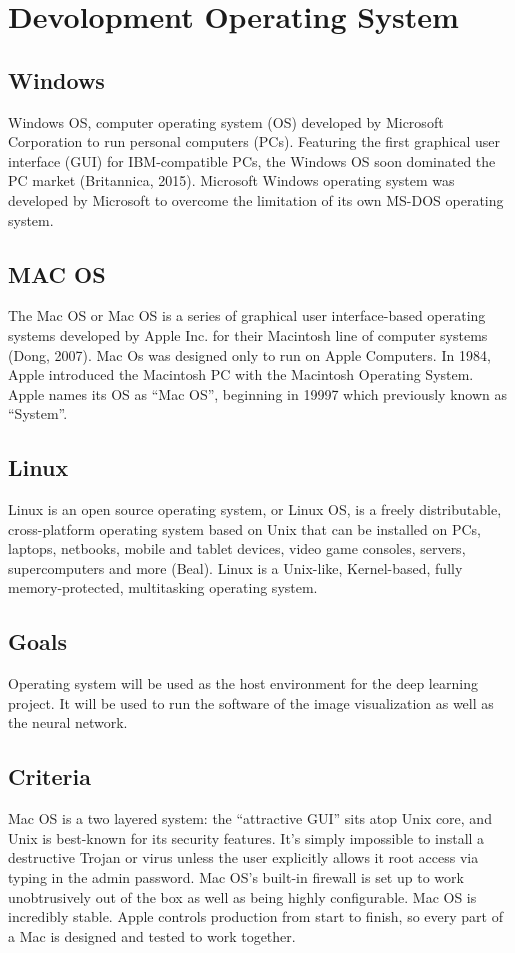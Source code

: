 \documentclass{scrreprt}
\begin{document}
\section{Devolopment Operating System}

\subsection{Windows}
Windows OS, computer operating system (OS) developed by Microsoft Corporation to run personal
computers (PCs). Featuring the first graphical user interface (GUI) for IBM-compatible PCs, the Windows
OS soon dominated the PC market (Britannica, 2015). Microsoft Windows operating system was
developed by Microsoft to overcome the limitation of its own MS-DOS operating system.

\subsection{MAC OS}
The Mac OS or Mac OS is a series of graphical user interface-based operating systems developed by
Apple Inc. for their Macintosh line of computer systems (Dong, 2007). Mac Os was designed only to run
on Apple Computers. In 1984, Apple introduced the Macintosh PC with the Macintosh Operating
System. Apple names its OS as “Mac OS”, beginning in 19997 which previously known as “System”.

\subsection{Linux}
Linux is an open source operating system, or Linux OS, is a freely distributable, cross-platform operating
system based on Unix that can be installed on PCs, laptops, netbooks, mobile and tablet devices, video
game consoles, servers, supercomputers and more (Beal). Linux is a Unix-like, Kernel-based, fully
memory-protected, multitasking operating system.

\subsection{Goals}
Operating system will be used as the host environment for the deep learning project.
It will be used to run the software of the image visualization as well as the neural network.

\subsection{Criteria}
Mac OS is a two layered system: the “attractive GUI” sits atop Unix core, and Unix is best-known for its
security features. It’s simply impossible to install a destructive Trojan or virus unless the user explicitly
allows it root access via typing in the admin password. Mac OS’s built-in firewall is set up to work
unobtrusively out of the box as well as being highly configurable. Mac OS is incredibly stable. Apple
controls production from start to finish, so every part of a Mac is designed and tested to work together.\newline
\end{document}
